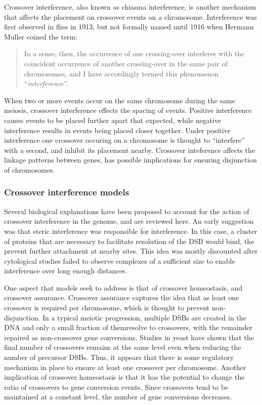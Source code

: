 Crossover interference, also known as chiasma interference, is another mechanism that affects the placement on crossover events on a chromosome.
Interference was first observed in flies in 1913\cite{Sturtevant1913}, but not formally named until 1916 when Hermann Muller coined the term:
\begin{quote}
    In a sense, then, the occurrence of one crossing-over interferes with the coincident occurrence of another crossing-over in the same pair of chromosomes, and I have accordingly termed this phenomenon ``\textit{interference}''.
\end{quote}
%
When two or more events occur on the same chromosome during the same meiosis, crossover interference effects the spacing of events.
Positive interference causes events to be placed further apart that expected, while negative interference results in events being placed closer together.
Under positive interference one crossover occuring on a chromosome is thought to ``interfere'' with a second, and inhibit its placement nearby.
Crossover inteference affects the linkage patterns between genes, has possible implications for ensuring disjunction of chromosomes.




\subsubsection{Crossover interference models}

Several biological explanations have been proposed to account for the action of crossover interference in the genome, and are reviewed here.
An early suggestion was that steric interference was responsible for interference.
In this case, a cluster of proteins that are necessary to facilitate resolution of the DSB would bind, the prevent further attachment at nearby sites.
This idea was mostly discounted after cytological studies failed to observe complexes of a sufficient size to enable interference over long enough distances.

One aspect that models seek to address is that of crossover homeostasis, and crossover assurance.
Crossover assurance captures the idea that as least one crossover is required per chromosome, which is thought to prevent non-disjunction.
In a typical meiotic progression, multiple DSBs are created in the DNA and only a small fraction of themresolve to crossovers, with the remainder repaired as non-crossover gene conversions.
Studies in yeast have shown that the final number of crossovers remains at the same level even when reducing the number of precursor DSBs\cite{Martini2006}.
Thus, it appears that there is some regulatory mechanism in place to ensure at least one crossover per chromosome.
Another implication of crossover homeostasis is that it has the potential to change the ratio of crossovers to gene conversion events.
Since crossovers tend to be maintained at a constant level, the number of gene conversions decreases.


